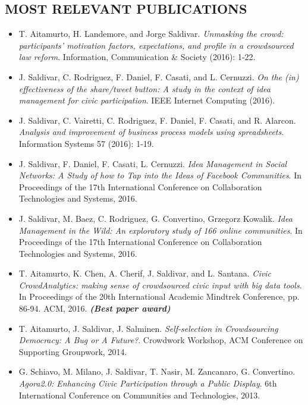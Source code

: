 \documentclass[line,margin]{res}
\begin{document}
\begin{resume}
\section{MOST RELEVANT PUBLICATIONS}
\begin{itemize} \itemsep -2pt 	
	\item T. Aitamurto, H. Landemore, and Jorge Saldivar. \emph{Unmasking the crowd: participants' motivation factors, expectations, and profile in a crowdsourced law reform}. Information, Communication \& Society (2016): 1-22.
	\item J. Saldivar, C. Rodriguez, F. Daniel, F. Casati, and L. Cernuzzi. \emph{On the (in) effectiveness of the share/tweet button: A study in the context of idea management for civic participation}. IEEE Internet Computing (2016).
	\item J. Saldivar, C. Vairetti, C. Rodriguez, F. Daniel, F. Casati, and R. Alarcon. \emph{Analysis and improvement of business process models using spreadsheets}. Information Systems 57 (2016): 1-19.
	\item J. Saldivar, F. Daniel, F. Casati, L. Cernuzzi. \emph{Idea Management in Social Networks: A Study of how to Tap into the Ideas of Facebook Communities}. In Proceedings of the 17th International Conference on Collaboration Technologies and Systems, 2016.
	\item J. Saldivar, M. Baez, C. Rodriguez, G. Convertino, Grzegorz Kowalik. \emph{Idea Management in the Wild: An exploratory study of 166 online communities}. In Proceedings of the 17th International Conference on Collaboration Technologies and Systems, 2016.	
	\item T. Aitamurto, K. Chen, A. Cherif, J. Saldivar, and L. Santana. \emph{Civic CrowdAnalytics: making sense of crowdsourced civic input with big data tools}. In Proceedings of the 20th International Academic Mindtrek Conference, pp. 86-94. ACM, 2016. \textit{\textbf{(Best paper award)}}
	\item T. Aitamurto, J. Saldivar, J. Salminen. \emph{Self-selection in Crowdsourcing Democracy: A Bug or A Future?}. Crowdwork Workshop, ACM Conference on Supporting Groupwork, 2014.
	\item G. Schiavo, M. Milano, J. Saldivar, T. Nasir, M. Zancanaro, G. Convertino. \emph{Agora2.0: Enhancing Civic Participation through a Public Display}. 6th International Conference on Communities and Technologies, 2013.
\end{itemize}


\end{resume}
\end{document}
